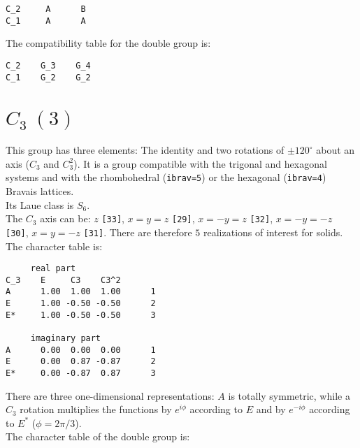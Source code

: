 \documentclass[12pt,a4paper,twoside]{report}
\begin{document}
\begin{tcolorbox}
\begin{footnotesize}
\begin{verbatim}
C_2     A      B  
C_1     A      A
\end{verbatim}
\end{footnotesize}
\end{tcolorbox}

The compatibility table for the double group is:

\begin{tcolorbox}
\begin{footnotesize}
\begin{verbatim}
C_2    G_3    G_4 
C_1    G_2    G_2
\end{verbatim}
\end{footnotesize}
\end{tcolorbox}

\newpage
{\color{coral}\section{$C_3\ (3)$}}
\color{black}
This group has three elements: The identity and two rotations of $\pm120^\circ$ 
about an axis ($C_3$ and $C_3^2$).
It is a group compatible with the trigonal and hexagonal systems and with the
rhombohedral (\texttt{ibrav=5}) or the hexagonal (\texttt{ibrav=4}) Bravais 
lattices. \\
Its Laue class is $S_6$. \\
The $C_3$ axis can be: $z$ \texttt{[33]}, $x=y=z$ \texttt{[29]}, 
$x=-y=z$ \texttt{[32]}, $x=-y=-z$ \texttt{[30]}, $x=y=-z$ \texttt{[31]}.
There are therefore $5$ realizations of interest for solids. \\
The character table is:

\begin{tcolorbox}
\begin{footnotesize}
\begin{verbatim}
     real part
C_3    E     C3    C3^2
A      1.00  1.00  1.00      1
E      1.00 -0.50 -0.50      2
E*     1.00 -0.50 -0.50      3

     imaginary part
A      0.00  0.00  0.00      1
E      0.00  0.87 -0.87      2
E*     0.00 -0.87  0.87      3 
\end{verbatim}
\end{footnotesize}
\end{tcolorbox}

There are three one-dimensional representations: $A$ is totally symmetric, while
a $C_3$ rotation multiplies the functions by $e^{i\phi}$ according to $E$
and by $e^{-i\phi}$ according to $E^*$ ($\phi=2 \pi / 3$). \\
The character table of the double group is:
\end{document}
